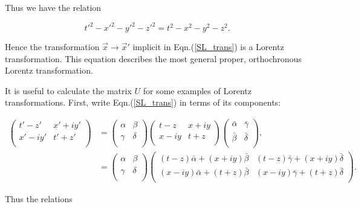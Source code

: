 \noindent Thus we have the relation

\begin{equation*}  
{t'}^2 - {x'}^2 - {y'}^2 - {z'}^2 = {t}^2 - {x}^2 - {y}^2 - {z}^2.
\end{equation*}

\noindent Hence the transformation $\vec{x} \rightarrow \vec{x}'$ implicit in Eqn.(\ref{SL_trans}) is a Lorentz transformation. This equation describes the most general proper, orthochronous Lorentz transformation.

It is useful to calculate the matrix $U$ for some examples of Lorentz transformations. First, write Eqn.(\ref{SL_trans}) in terms of its components:

\begin{align*} 
\left(
\begin{array}{cc}
t' - z' & x' + i y' \\
x' - i y' & t' + z' \\
\end{array}
\right)
& =
\left(
\begin{array}{cc}
\alpha & \beta \\
\gamma & \delta \\
\end{array}
\right)
\left(
\begin{array}{cc}
t-z & x + i y \\
x - i y & t + z   \\
\end{array}
\right)
\left(
\begin{array}{cc}
\bar{\alpha} & \bar{\gamma} \\
\bar{\beta} & \bar{\delta} \\
\end{array}
\right), \\
& = \left(
\begin{array}{cc}
\alpha & \beta \\
\gamma & \delta \\
\end{array}
\right)
\left(
\begin{array}{cc}
(t-z)\bar{\alpha} + (x + iy)\bar{\beta} & (t-z)\bar{\gamma} + (x + iy)\bar{\delta} \\
(x - iy)\bar{\alpha} + (t+z)\bar{\beta} & (x-iy)\bar{\gamma} + (t+z)\bar{\delta} \\
\end{array}
\right).
\end{align*}

\noindent Thus the relations

